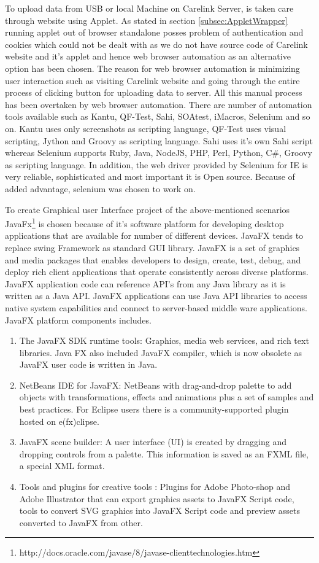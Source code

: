 \documentclass[article,type=msc,colorback,accentcolor=tud9c,twoside,11pt]{tudthesis}
\begin{document}
	To upload data from USB or local Machine on Carelink Server, is taken care through website using Applet. As stated in section \ref{subsec:AppletWrapper} running applet out of browser standalone posses problem of authentication and cookies which could not be dealt with as we do not have source code of Carelink website and it's applet and hence web browser automation as an alternative option has been chosen. The reason for web browser automation is minimizing user interaction such as visiting Carelink website and going through the entire process of clicking button for uploading data to server. All this manual process has been overtaken by web browser automation. There are number of automation tools available such as Kantu, QF-Test, Sahi, SOAtest, iMacros, Selenium and so on. Kantu uses only screenshots as scripting language, QF-Test uses visual scripting, Jython and Groovy as scripting language. Sahi uses it's own Sahi script whereas Selenium supports Ruby, Java, NodeJS, PHP, Perl, Python, C\#, Groovy as scripting language. In addition, the web driver provided by Selenium for IE is very reliable, sophisticated and most important it is Open source. Because of added advantage, selenium was chosen to work on.
	
	To create Graphical user Interface project of the above-mentioned scenarios JavaFx\footnote{http://docs.oracle.com/javase/8/javase-clienttechnologies.htm} is chosen because of it's software platform for developing desktop applications that are available for number of different devices. JavaFX tends to replace swing Framework as standard GUI library. JavaFX is a set of graphics and media packages that enables developers to design, create, test, debug, and deploy rich client applications that operate consistently across diverse platforms. JavaFX application code can reference API's from any Java library as it is written as a Java API. JavaFX applications can use Java API libraries to access native system capabilities and connect to server-based middle ware applications. JavaFX platform components includes.
	\begin{enumerate}
		\item The JavaFX SDK runtime tools: Graphics, media web services, and rich text libraries. Java FX  also included JavaFX compiler, which is now obsolete as JavaFX user code is written in Java.
		\item NetBeans IDE for JavaFX: NetBeans with drag-and-drop palette to add objects with transformations, effects and animations plus a set of samples and best practices. For Eclipse users there is a community-supported plugin hosted on e(fx)clipse.
		\item JavaFX scene builder: A user interface (UI) is created by dragging and dropping controls from a palette. This information is saved as an FXML file, a special XML format.
		\item Tools and plugins for creative tools : Plugins for Adobe Photo-shop and Adobe Illustrator that can export graphics assets to JavaFX Script code, tools to convert SVG graphics into JavaFX Script code and preview assets converted to JavaFX from other.
	\end{enumerate}
	
\end{document}
